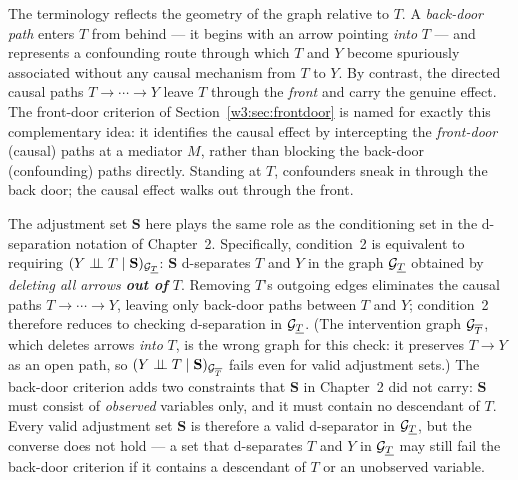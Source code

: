 \documentclass[master.tex]{subfiles}
\begin{document}
\begin{remark}
The terminology reflects the geometry of the graph relative to $T$.
A \emph{back-door path} enters $T$ from behind --- it begins with an arrow
pointing \emph{into} $T$ --- and represents a confounding route through
which $T$ and $Y$ become spuriously associated without any causal mechanism
from $T$ to $Y$.  By contrast, the directed causal paths
$T \to \cdots \to Y$ leave $T$ through the \emph{front} and carry the
genuine effect.  The front-door criterion of
Section~\ref{w3:sec:frontdoor} is named for exactly this complementary
idea: it identifies the causal effect by intercepting the \emph{front-door}
(causal) paths at a mediator $M$, rather than blocking the back-door
(confounding) paths directly.
Standing at $T$, confounders sneak in through the back door; the causal
effect walks out through the front.
\end{remark}

\begin{remark}
The adjustment set $\mathbf{S}$ here plays the same role as the
conditioning set in the d-separation notation of Chapter~2.
Specifically, condition~2 is equivalent to requiring
$(Y \perp\!\!\!\perp T \mid \mathbf{S})_{\mathcal{G}_{\underline{T}}}$:
$\mathbf{S}$ d-separates $T$ and $Y$ in the graph $\mathcal{G}_{\underline{T}}$
obtained by \emph{deleting all arrows \textbf{out of} $T$}.  Removing
$T$'s outgoing edges eliminates the causal paths $T \to \cdots \to Y$,
leaving only back-door paths between $T$ and $Y$; condition~2 therefore
reduces to checking d-separation in $\mathcal{G}_{\underline{T}}$.  (The
intervention graph $\mathcal{G}_{\overline{T}}$, which deletes arrows
\emph{into} $T$, is the wrong graph for this check: it preserves
$T \to Y$ as an open path, so $(Y \perp\!\!\!\perp T \mid \mathbf{S})_{\mathcal{G}_{\overline{T}}}$
fails even for valid adjustment sets.)
The back-door criterion adds two constraints that $\mathbf{S}$ in
Chapter~2 did not carry: $\mathbf{S}$ must consist of \emph{observed}
variables only, and it must contain no descendant of $T$.  Every valid
adjustment set $\mathbf{S}$ is therefore a valid d-separator in
$\mathcal{G}_{\underline{T}}$, but the converse does not hold --- a set that
d-separates $T$ and $Y$ in $\mathcal{G}_{\underline{T}}$ may still fail the
back-door criterion if it contains a descendant of $T$ or an unobserved
variable.
\end{remark}
\end{document}
